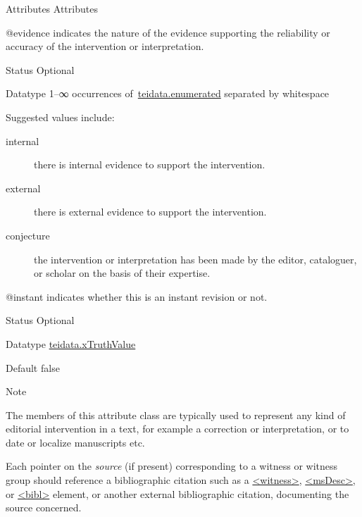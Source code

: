 \begin{reflist}
    \item[{Attributes}]
  Attributes\hfil\\[-10pt]\begin{sansreflist}
    \item[@evidence]
  indicates the nature of the evidence supporting the reliability or accuracy of the intervention or interpretation.
\begin{reflist}
    \item[{Status}]
  Optional
    \item[{Datatype}]
  1–∞ occurrences of \hyperref[TEI.teidata.enumerated]{teidata.enumerated} separated by whitespace
    \item[{Suggested values include:}]
  \begin{description}

\item[{internal}]there is internal evidence to support the intervention.
\item[{external}]there is external evidence to support the intervention.
\item[{conjecture}]the intervention or interpretation has been made by the editor, cataloguer, or scholar on the basis of their expertise.
\end{description} 
\end{reflist}  
    \item[@instant]
  indicates whether this is an instant revision or not.
\begin{reflist}
    \item[{Status}]
  Optional
    \item[{Datatype}]
  \hyperref[TEI.teidata.xTruthValue]{teidata.xTruthValue}
    \item[{Default}]
  false
\end{reflist}  
\end{sansreflist}  
    \item[{Note}]
  \par
The members of this attribute class are typically used to represent any kind of editorial intervention in a text, for example a correction or interpretation, or to date or localize manuscripts etc.\par
Each pointer on the {\itshape source} (if present) corresponding to a witness or witness group should reference a bibliographic citation such as a \hyperref[TEI.witness]{<witness>}, \hyperref[TEI.msDesc]{<msDesc>}, or \hyperref[TEI.bibl]{<bibl>} element, or another external bibliographic citation, documenting the source concerned.
\end{reflist}  
